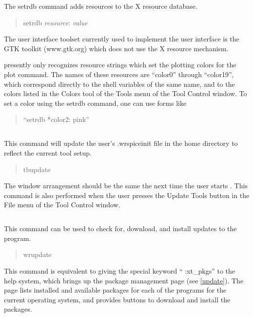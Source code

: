 
The {\cb setrdb} command adds resources to the X resource database.
\begin{quote}\vt
setrdb {\it resource\/}: {\it value}
\end{quote}
The user interface toolset currently used to implement the {\WRspice}
user interface is the GTK toolkit ({\vt www.gtk.org}) which does not
use the X resource mechanism.

{\WRspice} presently only recognizes resource strings which set the
plotting colors for the {\cb plot} command.  The names of these
resources are ``{\vt color0}'' through ``{\vt color19}'', which
correspond directly to the shell variables of the same name, and to
the colors listed in the {\cb Colors} tool of the {\cb Tools} menu of
the {\cb Tool Control} window.  To set a color using the {\cb setrdb}
command, one can use forms like
\begin{quote}
``{\vt setrdb *color2:  pink}''
\end{quote}

\subsection{}


This command will update the user's {\vt .wrspiceinit} file in the
home directory to reflect the current tool setup.
\begin{quote}\vt
tbupdate
\end{quote}
The window arrangement should be the same the next time the user
starts {\WRspice}.  This command is also performed when the user
presses the {\cb Update Tools} button in the {\cb File} menu of the
{\cb Tool Control} window.

\subsection{}


This command can be used to check for, download, and install updates
to the program.
\begin{quote}
{\vt wrupdate}
\end{quote}
This command is equivalent to giving the special keyword ``{\vt
:xt\_pkgs}'' to the help system, which brings up the {\XicTools}
package management page (see \ref{update}).  The page lists installed
and available packages for each of the {\XicTools} programs for the
current operating system, and provides buttons to download and install
the packages.

